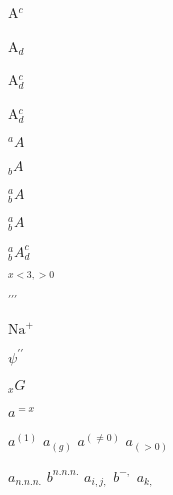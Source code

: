\documentclass{article}
\begin{document}
A$^c$

A$_d$

A$^c_d$

A$_d^c$


$^aA$

$_bA$

$^a_bA$

$_b^aA$

$_b^aA^c_d$

$_{x<3,>0}$

$^{\prime\prime\prime}$

$\mathrm{Na}^+$ 

$\psi^{\prime\prime}$

$ _{\mathord{x}}\mathord{G} $

$ a^{= x}$

$ a ^{(1)} $
$ a _{(g)} $
$ a ^{(\neq 0)} $
$ a _{(>0)} $

$ a_{n.n.n.} $
$ b^{n.n.n.} $
$ a_{i,j,} $
$ b^{-,} $
$ a_{k,} $
\end{document}
